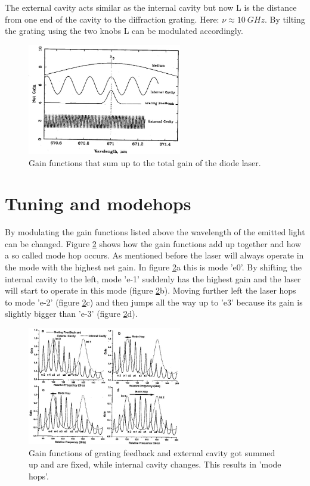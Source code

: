 The external cavity acts similar as the internal cavity but now L is the distance from one end of the cavity to the diffraction grating. Here: $\nu \approx \SI{10}{GHz}$. By tilting the grating using the two knobs L can be modulated accordingly.
\begin{figure}[H]
	\includegraphics[width=0.6\textwidth]{../pics/gains.jpg}
	\caption{Gain functions that sum up to the total gain of the diode laser.}
	\label{fig:gains}
\end{figure}

\section{Tuning and modehops}
By modulating the gain functions listed above the wavelength of the emitted light can be changed. Figure \ref{fig:modeHop} shows how the gain functions add up together and how a so called mode hop occurs. As mentioned before the laser will always operate in the mode with the highest net gain. In figure \ref{fig:modeHop}a this is mode 'e0'. By shifting the internal cavity to the left, mode 'e-1' suddenly has the highest gain and the laser will start to operate in this mode (figure \ref{fig:modeHop}b). Moving further left the laser hops to mode 'e-2' (figure \ref{fig:modeHop}c) and then jumps all the way up to 'e3' because its gain is slightly bigger than 'e-3' (figure \ref{fig:modeHop}d).

\begin{figure}[H]
\includegraphics[width=0.6\textwidth]{../pics/modeHop.jpg}
\caption{Gain functions of grating feedback and external cavity got summed up and are fixed, while internal cavity changes. This results in 'mode hops'.}
\label{fig:modeHop}
\end{figure}


